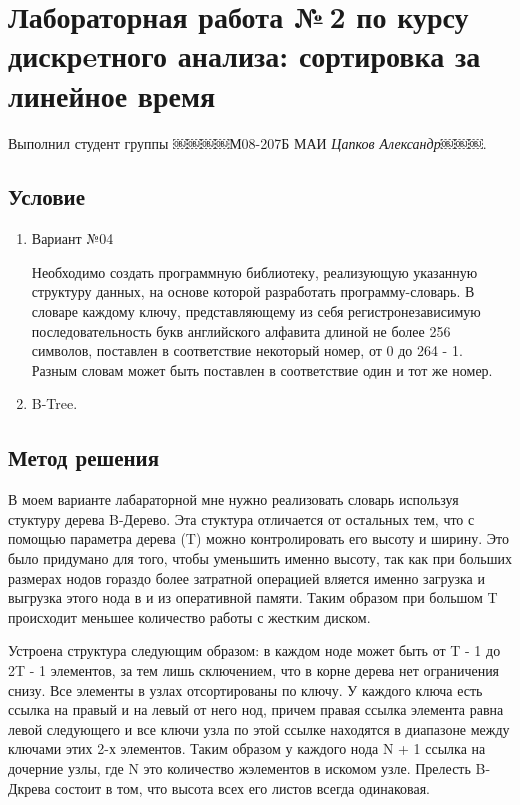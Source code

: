 \documentclass[12pt]{article}
\begin{document}
\section*{Лабораторная работа №\,2 по курсу дискрeтного анализа: сортировка за линейное время}

Выполнил студент группы ￼￼￼￼М08-207Б МАИ \textit{Цапков Александр￼￼￼}.

\subsection*{Условие}

\begin{enumerate}
\item Вариант №04

Необходимо создать программную библиотеку, реализующую указанную структуру данных, на основе которой разработать программу-словарь. В словаре каждому ключу, представляющему из себя регистронезависимую последовательность букв английского алфавита длиной не более 256 символов, поставлен в соответствие некоторый номер, от 0 до 264 - 1. Разным словам может быть поставлен в соответствие один и тот же номер.
\item B-Tree.
 
\end{enumerate}

\subsection*{Метод решения}

В моем варианте лабараторной мне нужно реализовать словарь используя стуктуру дерева B-Дерево. Эта стуктура отличается от остальных тем, что с помощью параметра дерева (T) можно контролировать его высоту и ширину. Это было придумано для того, чтобы уменьшить именно высоту, так как при больших размерах нодов гораздо более затратной операцией вляется именно загрузка и выгрузка этого нода в и из оперативной памяти. Таким образом при большом T происходит меньшее количество работы с жестким диском. 

Устроена структура следующим образом: в каждом ноде может быть от T - 1 до 2T - 1  элементов, за тем лишь сключением, что в корне дерева нет ограничения снизу. Все элементы в узлах отсортированы по ключу. У каждого ключа есть ссылка на правый и на левый от него нод, причем правая ссылка элемента равна левой следующего и все ключи узла по этой ссылке находятся в диапазоне между ключами этих 2-х элементов. Таким образом у каждого нода  N + 1 ссылка на дочерние узлы, где N это количество жэлементов в искомом узле. Прелесть B-Дкрева состоит в том, что высота всех его листов всегда одинаковая.  
\end{document}

